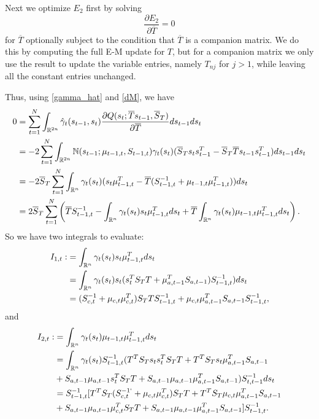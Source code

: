 \documentclass[12pt,leqno]{article}
\begin{document}
Next we optimize $E_2$ first by solving
$$
\frac{\partial{E_2}}{\partial{\overline{T}}} = 0
$$
for $\overline{T}$ optionally subject to the condition that $\overline{T}$ is a companion matrix.  We do this
by computing the full E-M update for $T$, but for a companion matrix we only use the result to update the variable entries,
namely $T_{nj}$ for $j > 1$, while leaving all the constant entries unchanged.

Thus, using \eqref{gamma_hat} and \eqref{dM}, we have
\begin{equation}\label{T:1}
  \begin{split}
0 &= \sum_{t=1}^N\int_{{\mathbb R}^{2n}}\hat{\gamma}_t(s_{t-1},s_t)
\frac{\partial{Q(s_t;\overline{T}s_{t-1},\overline{S}_T)}}{\partial\overline{T}}ds_{t-1}ds_t \\
&= -2\sum_{t=1}^N\int_{{\mathbb R}^{2n}}{\mathbb N}(s_{t-1};\mu_{t-1,t},S_{t-1,t})\gamma_t(s_t)(\overline{S}_Ts_ts_{t-1}^T -
\overline{S}_T\overline{T}s_{t-1}s_{t-1}^T) ds_{t-1}ds_t \\
&= -2\overline{S}_T\sum_{t=1}^N\int_{{\mathbb R}^{n}}\gamma_t(s_t) (s_t\mu_{t-1,t}^T -
\overline{T}(S_{t-1,t}^{-1} + \mu_{t-1,t}\mu_{t-1,t}^T))ds_t \\
&= 2\overline{S}_T\sum_{t=1}^N\left(\overline{T}S_{t-1,t}^{-1} - \int_{{\mathbb R}^n}\gamma_t(s_t)s_t\mu_{t-1,t}^Tds_t +
\overline{T}\int_{{\mathbb R}^n}\gamma_t(s_t)\mu_{t-1,t}\mu_{t-1,t}^Tds_t\right).\\
  \end{split}
\end{equation}
So we have two integrals to evaluate:
\begin{equation}\label{I_1}
  \begin{split}
  I_{1,t} :&= \int_{{\mathbb R}^n}\gamma_t(s_t)s_t\mu_{t-1,t}^Tds_t \\
  &= \int_{{\mathbb R}^n}\gamma_t(s_t)s_t(s_t^TS_TT + \mu_{a,t-1}^TS_{a,t-1})S_{t-1,t}^{-1})ds_t \\
  &= (S_{c,t}^{-1} + \mu_{c,t}\mu_{c,t}^T)S_TTS_{t-1,t}^{-1} + \mu_{c,t}\mu_{a,t-1}^TS_{a,t-1}S_{t-1,t}^{-1},
  \end{split}
  \end{equation}
and
\begin{equation}\label{I_2}
  \begin{split}
  I_{2,t} :&= \int_{{\mathbb R}^n}\gamma_t(s_t)\mu_{t-1,t}\mu_{t-1,t}^Tds_t \\
  &= \int_{{\mathbb R}^n}\gamma_t(s_t)S_{t-1,t}^{-1}(T^TS_Ts_ts_t^TS_TT + T^TS_Ts_t\mu_{a,t-1}^TS_{a,t-1} \\
  &+ S_{a,t-1}\mu_{a,t-1}s_t^TS_TT + S_{a,t-1}\mu_{a,t-1}\mu_{a,t-1}^TS_{a,t-1}) S_{t,t-1}^{-1}ds_t \\
  &= S_{t-1,t}^{-1}[T^TS_T(S_{c,t}^{-1`}+\mu_{c,t}\mu_{c,t}^T)S_TT + T^TS_T\mu_{c,t}\mu_{a,t-1}^TS_{a,t-1} \\
  &+ S_{a,t-1}\mu_{a,t-1}\mu_{c,t}^TS_TT + S_{a,t-1}\mu_{a,t-1}\mu_{a,t-1}^TS_{a,t-1}]S_{t-1,t}^{-1}. \\
\end{split}
\end{equation}
\end{document}
